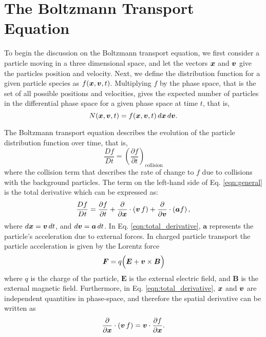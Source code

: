 \section{The Boltzmann Transport Equation}
To begin the discussion on the Boltzmann transport equation, we first consider a particle moving in a three dimensional space, and let the vectors $\boldsymbol{x}$ and $\boldsymbol{v}$ give the particles position and velocity. Next, we define the distribution function for a given particle species as $f(\boldsymbol{x},\boldsymbol{v},t)$. Multiplying $f$ by the phase space, that is the set of all possible positions and velocities, gives the expected number of particles in the differential phase space for a given phase space at time $t$, that is,
\begin{equation}
  N(\boldsymbol{x},\boldsymbol{v},t) = f(\boldsymbol{x},\boldsymbol{v},t) \, d\boldsymbol{x} \, d\boldsymbol{v}.
\end{equation}

The Boltzmann transport equation describes the evolution of the particle distribution function over time, that is,
\begin{equation} \label{eqn:general}
  \dfrac{D f}{D t} = \left( \dfrac{\partial f}{\partial t} \right)_{\text{collision}} 
\end{equation}
where the collision term that describes the rate of change to $f$ due to collisions with the background particles. The term on the left-hand side of Eq. \eqref{eqn:general} is the total derivative which can be expressed as:
\begin{equation} \label{eqn:total_derivative}
    \dfrac{D f}{Dt} = \dfrac{\partial f}{\partial t} + \dfrac{\partial}{\partial \Bx} \cdot \left( \Bv \, f \right) + \dfrac{\partial}{\partial \Bv} \cdot \left( \boldsymbol{a} f \right),
\end{equation}
where $d\boldsymbol{x} = \boldsymbol{v} \, dt$, and $d\boldsymbol{v} = \boldsymbol{a} \, dt$. In Eq. \eqref{eqn:total_derivative}, $\boldsymbol{a}$ represents the particle's acceleration due to external forces. In charged particle transport the particle acceleration is given by the Lorentz force
\begin{equation} \label{eqn:lorentz}
  \boldsymbol{F} = q \Big( \boldsymbol{E} + \Bv \times \boldsymbol{B} \Big)
\end{equation}
where $q$ is the charge of the particle, $\boldsymbol{E}$ is the external electric field, and $\boldsymbol{B}$ is the external magnetic field. Furthermore, in Eq. \eqref{eqn:total_derivative}, $\boldsymbol{x}$ and $\boldsymbol{v}$ are independent quantities in phase-space, and therefore the spatial derivative can be written as
\begin{equation} \label{eqn:spatial_derivative}
  \dfrac{\partial}{\partial \Bx} \cdot \left( \Bv \, f \right) = \Bv \cdot \dfrac{\partial f}{\partial \Bx}.
\end{equation}

